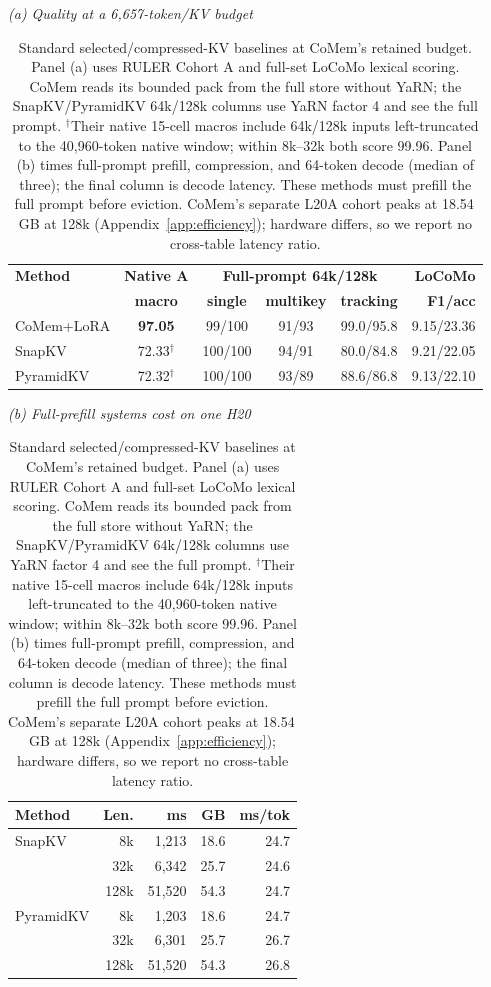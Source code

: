\begin{table}[!tp]
\centering
\scriptsize
\setlength{\tabcolsep}{3.2pt}
\begin{minipage}[t]{0.59\textwidth}
\centering
\textit{(a) Quality at a 6,657-token/KV budget}\\[-2pt]
\begin{tabular}{@{}lccccr@{}}
\toprule
\textbf{Method} & \textbf{Native A} & \multicolumn{3}{c}{\textbf{Full-prompt 64k/128k}} & \textbf{LoCoMo} \\
& \textbf{macro} & \textbf{single} & \textbf{multikey} & \textbf{tracking} & \textbf{F1/acc} \\
\midrule
CoMem+LoRA & \textbf{97.05} & 99/100 & 91/93 & 99.0/95.8 & 9.15/23.36 \\
SnapKV & 72.33$^{\dagger}$ & 100/100 & 94/91 & 80.0/84.8 & 9.21/22.05 \\
PyramidKV & 72.32$^{\dagger}$ & 100/100 & 93/89 & 88.6/86.8 & 9.13/22.10 \\
\bottomrule
\end{tabular}
\end{minipage}
\hfill
\begin{minipage}[t]{0.38\textwidth}
\centering
\textit{(b) Full-prefill systems cost on one H20}\\[-2pt]
\begin{tabular}{@{}lrrrr@{}}
\toprule
\textbf{Method} & \textbf{Len.} & \textbf{ms} & \textbf{GB} & \textbf{ms/tok} \\
\midrule
SnapKV & 8k & 1,213 & 18.6 & 24.7 \\
& 32k & 6,342 & 25.7 & 24.6 \\
& 128k & 51,520 & 54.3 & 24.7 \\
PyramidKV & 8k & 1,203 & 18.6 & 24.7 \\
& 32k & 6,301 & 25.7 & 26.7 \\
& 128k & 51,520 & 54.3 & 26.8 \\
\bottomrule
\end{tabular}
\end{minipage}
\caption{Standard selected/compressed-KV baselines at CoMem's retained budget.
Panel (a) uses RULER Cohort A and full-set LoCoMo lexical scoring. CoMem reads
its bounded pack from the full store without YaRN; the SnapKV/PyramidKV 64k/128k
columns use YaRN factor 4 and see the full prompt. $^{\dagger}$Their native
15-cell macros include 64k/128k inputs left-truncated to the 40,960-token native
window; within 8k--32k both score 99.96. Panel (b) times full-prompt prefill,
compression, and 64-token decode (median of three); the final column is decode
latency. These methods must prefill the full prompt before eviction. CoMem's
separate L20A cohort peaks at 18.54\,GB at 128k
(Appendix~\ref{app:efficiency}); hardware differs, so we report no cross-table latency
ratio.}
\label{tab:kvcompress}
\end{table}
